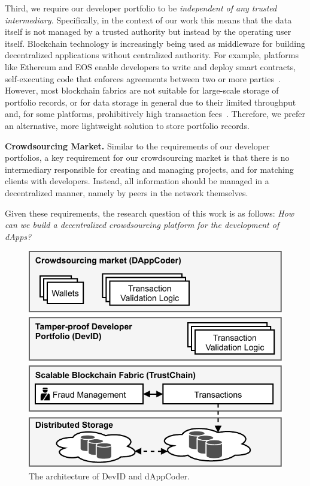 Third, we require our developer portfolio to be \emph{independent of any trusted intermediary}.
Specifically, in the context of our work this means that the data itself is not managed by a trusted authority but instead by the operating user itself.
Blockchain technology is increasingly being used as middleware for building decentralized applications without centralized authority.
For example, platforms like Ethereum and EOS enable developers to write and deploy smart contracts, self-executing code that enforces agreements between two or more parties~\cite{szabo1997formalizing}.
However, most blockchain fabrics are not suitable for large-scale storage of portfolio records, or for data storage in general due to their limited throughput and, for some platforms, prohibitively high transaction fees~\cite{eberhardt2017or}.
Therefore, we prefer an alternative, more lightweight solution to store portfolio records.

\textbf{Crowdsourcing Market.}
Similar to the requirements of our developer portfolios, a key requirement for our crowdsourcing market is that there is no intermediary responsible for creating and managing projects, and for matching clients with developers.
Instead, all information should be managed in a decentralized manner, namely by peers in the network themselves.

Given these requirements, the research question of this work is as follows:
\textit{How can we build a decentralized crowdsourcing platform for the development of dApps?}
\begin{figure}[t!]
	\centering
	\includegraphics[width=.7\linewidth]{devid/resources/architecture.pdf}
	\caption{The architecture of DevID and dAppCoder.}
	\label{fig:system_architecture}
\end{figure}

